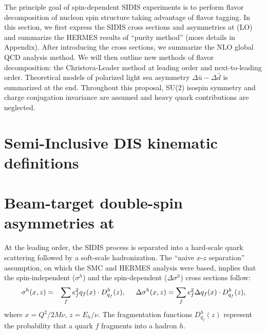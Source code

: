 
The principle goal of spin-dependent SIDIS experiments is to perform flavor 
decomposition of nucleon spin structure taking advantage of flavor tagging. 
In this section, we first express the SIDIS cross sections and asymmetries at 
\lo (LO) and summarize the HERMES results of ``purity method'' (more details
 in Appendix). After introducing the \nlo cross sections, we 
 summarize the NLO global QCD analysis method. 
We will then outline new methods of flavor decomposition:
the Christova-Leader method at leading order and next-to-leading order.
Theoretical models
of polarized light sea asymmetry $\Delta \bar{u}-\Delta \bar{d}$ is summarized at the end.
Throughout this proposal, SU(2) isospin symmetry and charge conjugation invariance are  
assumed and heavy quark contributions are neglected.

\section{Semi-Inclusive DIS kinematic definitions}

\section{Beam-target double-spin asymmetries at \lo}
 At the leading order, the 
 SIDIS process is separated into a hard-scale quark scattering 
 followed by a soft-scale hadronization.
 The ``naive $x$-$z$ separation'' assumption, on which the SMC and HERMES
analysis were based, implies that the spin-independent 
($\sigma^{h}$)
and the spin-dependent ($\Delta \sigma^{h}$)
  cross sections follow: 
\begin{eqnarray}  
 \sigma^{h} (x,z) & = & \sum_{f} e_f^2 q_f(x) \cdot D_{q_f}^{h}(z),  \hspace{0.5cm}
 \Delta \sigma^{h} (x,z)  =  \sum_{f} e_f^2 \Delta q_f(x) \cdot D_{q_f}^{h}(z),  
\label{eq:fact}  
\end{eqnarray}  
where $x=Q^2/2M\nu$, $z=E_h/\nu$.
 The fragmentation functions $D_{q_f}^{h}(z)$ represent the probability that a quark
 $f$ fragments into a hadron $h$.  

